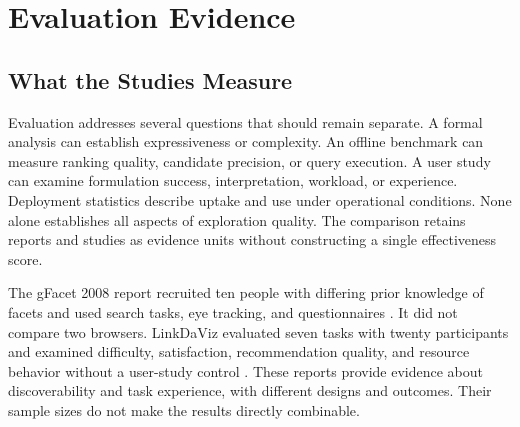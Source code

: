 \documentclass[manuscript,review,screen]{acmart}
\begin{document}
\section{Evaluation Evidence}
\subsection{What the Studies Measure}
Evaluation addresses several questions that should remain separate. A formal analysis can establish expressiveness or complexity. An offline benchmark can measure ranking quality, candidate precision, or query execution. A user study can examine formulation success, interpretation, workload, or experience. Deployment statistics describe uptake and use under operational conditions. None alone establishes all aspects of exploration quality. The comparison retains reports and studies as evidence units without constructing a single effectiveness score.

The gFacet 2008 report recruited ten people with differing prior knowledge of facets and used search tasks, eye tracking, and questionnaires \citep{2008_Heim_gFacet_A}. It did not compare two browsers. LinkDaViz evaluated seven tasks with twenty participants and examined difficulty, satisfaction, recommendation quality, and resource behavior without a user-study control \citep{2015_Thellmann_LinkDaViz_Automatic}. These reports provide evidence about discoverability and task experience, with different designs and outcomes. Their sample sizes do not make the results directly combinable.
\end{document}
